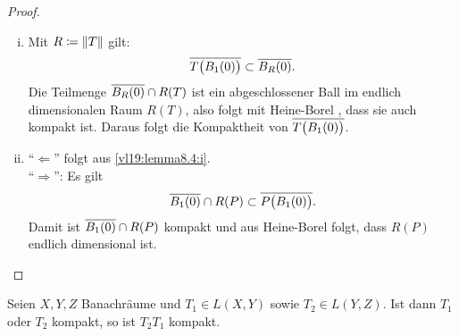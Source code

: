 \begin{proof}
    \begin{enumerate}[(i)]
        \item
            Mit $R\coloneqq \lVert T\rVert$ gilt:
            \[ \overline{T\bigl( B_1(0) \bigr)}
                \subset \overline{B_R(0)}
            . \]
            Die Teilmenge $\overline{B_R(0)}\cap R(T)$ ist ein abgeschlossener
            Ball im endlich dimensionalen Raum $R(T)$, also folgt mit
            Heine-Borel , dass sie auch kompakt ist.
            Daraus folgt die Kompaktheit von $\overline{T\bigl( B_1(0)
            \bigr)}$.
            
        \item
            \enquote{$\Leftarrow$} folgt aus \ref{vl19:lemma8.4:i}.
            \\
            \enquote{$\Rightarrow$}: Es gilt
            \[ \overline{B_1(0)}\cap R(P) \subset
                \overline{P\bigl(B_1(0)\bigr)}
            . \]
            Damit ist $\overline{B_1(0)}\cap R(P)$ kompakt und aus Heine-Borel
             folgt, dass $R(P)$ endlich dimensional ist.
    \end{enumerate}
\end{proof}

\begin{thLemma} \label{vl19:lemma8.5}
    Seien $X,Y,Z$ Banachräume und $T_1\in L(X,Y)$ sowie $T_2\in L(Y,Z)$.
    Ist dann $T_1$ oder $T_2$ kompakt, so ist $T_2T_1$ kompakt.
\end{thLemma}


